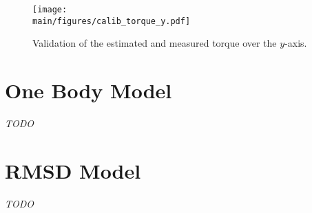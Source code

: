 \documentclass[/home/francois/latex/report/main.tex]{subfiles}
\begin{document}
\begin{figure}[h]
  \centering
  \texttt{[image: \\main/figures/calib\_torque\_y.pdf]}
  \caption{Validation of the estimated and measured torque over the $y$-axis.}
  \label{fig:results:calibration:suction-torque-y}
\end{figure}


\section{One Body Model}

\textit{TODO}

\section{RMSD Model}

\textit{TODO}
\end{document}
